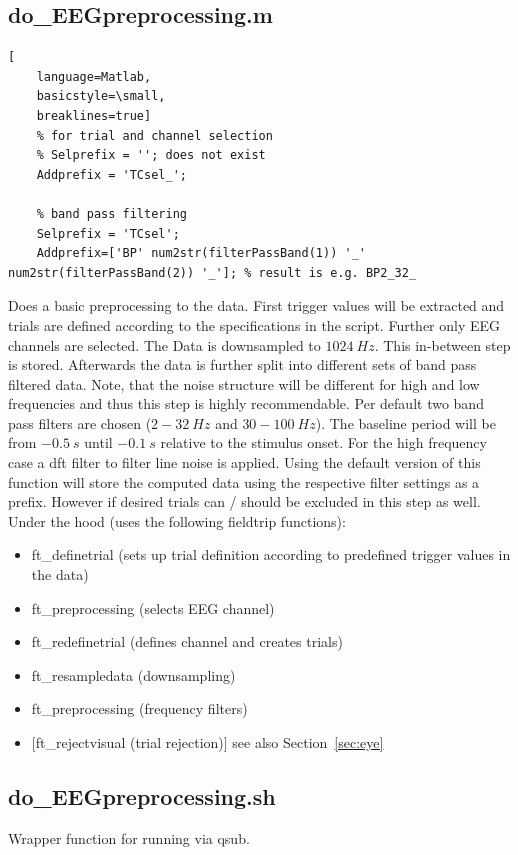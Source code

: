 \documentclass[12pt,a4paper]{scrartcl}
\begin{document}
\subsection{do\_EEGpreprocessing.m}
\label{m:EEGpreproc}
\begin{lstlisting}[
    language=Matlab,
    basicstyle=\small,
    breaklines=true]
    % for trial and channel selection
    % Selprefix = ''; does not exist
    Addprefix = 'TCsel_';

    % band pass filtering
    Selprefix = 'TCsel';
    Addprefix=['BP' num2str(filterPassBand(1)) '_' num2str(filterPassBand(2)) '_']; % result is e.g. BP2_32_
\end{lstlisting}
Does a basic preprocessing to the data. First trigger values will be extracted and trials are defined according to the specifications in the script. Further only EEG channels are selected. The Data is downsampled to $1024~Hz$. This in-between step is stored. Afterwards the data is further split into different sets of band pass filtered data. Note, that the noise structure will be different for high and low frequencies and thus this step is highly recommendable. Per default two band pass filters are chosen ($2-32~Hz$ and $30-100~Hz$). The baseline period will be from $-0.5~s$ until $-0.1~s$ relative to the stimulus onset. For the high frequency case a dft filter to filter line noise is applied. Using the default version of this function will store the computed data using the respective filter settings as a prefix. However if desired trials can / should be excluded in this step as well.\\

\noindent Under the hood (uses the following fieldtrip functions):
\begin{itemize}
\item ft\_definetrial (sets up trial definition according to predefined trigger values in the data)
\item ft\_preprocessing (selects EEG channel)
\item ft\_redefinetrial (defines channel and creates trials)
\item ft\_resampledata (downsampling)
\item ft\_preprocessing (frequency filters)
\item $[$ft\_rejectvisual (trial rejection)$]$ see also Section~\ref{sec:eye}
\end{itemize}

\subsection{do\_EEGpreprocessing.sh}
\label{sh:EEGpreproc}
Wrapper function for running \texttt{} via qsub.\\
\end{document}
